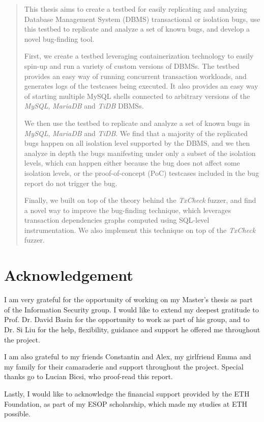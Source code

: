 \begin{abstract}

This thesis aims to create a testbed for easily replicating and analyzing Database Management System (DBMS) transactional or isolation bugs, use this testbed to replicate and analyze a set of known bugs, and develop a novel bug-finding tool.

First, we create a testbed leveraging containerization technology to easily spin-up and run a variety of custom versions of DBMSs. The testbed provides an easy way of running concurrent transaction workloads, and generates logs of the testcases being executed. It also provides an easy way of starting multiple MySQL shells connected to arbitrary versions of the \textit{MySQL}, \textit{MariaDB} and \textit{TiDB} DBMSs.

We then use the testbed to replicate and analyze a set of known bugs in \textit{MySQL}, \textit{MariaDB} and \textit{TiDB}. We find that a majority of the replicated bugs happen on all isolation level supported by the DBMS, and we then analyze in depth the bugs manifesting under only a subset of the isolation levels, which can happen either because the bug does not affect some isolation levels, or the proof-of-concept (PoC) testcases included in the bug report do not trigger the bug.

Finally, we built on top of the theory behind the \textit{TxCheck} fuzzer, and find a novel way to improve the bug-finding technique, which leverages transaction dependencies graphs computed using SQL-level instrumentation. We also implement this technique on top of the \textit{TxCheck} fuzzer.
  
\end{abstract}

\newpage


\section*{Acknowledgement}
I am very grateful for the opportunity of working on my Master's thesis as part of the Information Security group. I would like to extend my deepest gratitude to Prof. Dr. David Basin for the opportunity to work as part of his group, and to Dr. Si Liu for the help, flexibility, guidance and support he offered me throughout the project.  

I am also grateful to my friends Constantin and Alex, my girlfriend Emma and my family for their camaraderie and support throughout the project. Special thanks go to Lucian Bicsi, who proof-read this report.

Lastly, I would like to acknowledge the financial support provided by the ETH Foundation, as part of my ESOP scholarship, which made my studies at ETH possible.

